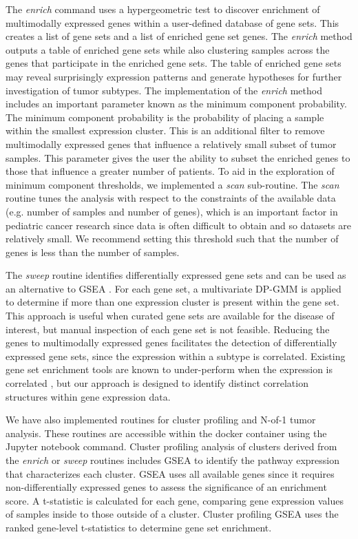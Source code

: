 \documentclass[10pt,letterpaper]{article}
\begin{document}
The \textit{enrich} command uses a hypergeometric test \cite{yuClusterProfilerPackageComparing2012} to discover enrichment of multimodally expressed genes within a user-defined database of gene sets. This creates a list of gene sets and a list of enriched gene set genes. The \textit{enrich} method outputs a table of enriched gene sets while also clustering samples across the genes that participate in the enriched gene sets. The table of enriched gene sets may reveal surprisingly expression patterns and generate hypotheses for further investigation of tumor subtypes. The implementation of the \textit{enrich} method includes an important parameter known as the minimum component probability. The minimum component probability is the probability of placing a sample within the smallest expression cluster. This is an additional filter to remove multimodally expressed genes that influence a relatively small subset of tumor samples. This parameter gives the user the ability to subset the enriched genes to those that influence a greater number of patients. To aid in the exploration of minimum component thresholds, we implemented a \textit{scan} sub-routine. The \textit{scan} routine tunes the analysis with respect to the constraints of the available data (e.g. number of samples and number of genes), which is an important factor in pediatric cancer research since data is often difficult to obtain and so datasets are relatively small. We recommend setting this threshold such that the number of genes is less than the number of samples. 

The \textit{sweep} routine identifies differentially expressed gene sets and can be used as an alternative to GSEA \cite{subramanianGeneSetEnrichment2005}. For each gene set, a multivariate DP-GMM is applied to determine if more than one expression cluster is present within the gene set. This approach is useful when curated gene sets are available for the disease of interest, but manual inspection of each gene set is not feasible. Reducing the genes to multimodally expressed genes facilitates the detection of differentially expressed gene sets, since the expression within a subtype is correlated. Existing gene set enrichment tools are known to under-perform when the expression is correlated \cite{tamayoLimitationsSimpleGene2016}, but our approach is designed to identify distinct correlation structures within gene expression data. 

We have also implemented routines for cluster profiling and N-of-1 tumor analysis. These routines are accessible within the docker container using the Jupyter notebook command. Cluster profiling analysis of clusters derived from the \textit{enrich} or \textit{sweep} routines includes GSEA \cite{korotkevichFastGeneSet2019} to identify the pathway expression that characterizes each cluster. GSEA uses all available genes since it requires non-differentially expressed genes to assess the significance of an enrichment score. A t-statistic is calculated for each gene, comparing gene expression values of samples inside to those outside of a cluster. Cluster profiling GSEA uses the ranked gene-level t-statistics to determine gene set enrichment. 
\end{document}

